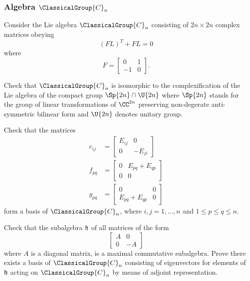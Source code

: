 \subsubsection{Algebra \texorpdfstring{$\ClassicalGroup{C}_{n}$}{Cn}}
Consider the Lie algebra $\ClassicalGroup{C}_{n}$ consisting of $2n\times2n$
complex matrices obeying
\begin{equation}
(FL)^{T}+FL=0
\end{equation}
where
\begin{equation}
F=\begin{bmatrix}0&1\\
-1&0
\end{bmatrix}.
\end{equation}

\begin{exercise}
Check that $\ClassicalGroup{C}_{n}$ is isomorphic to the complexification of the
Lie algebra of the compact group $\Sp{2n}\cap \U{2n}$ where
$\Sp{2n}$ stands for the group of linear transformations of
$\CC^{2n}$ preserving non-degerate anti-symmetric bilinear
form and $\U{2n}$ denotes unitary group.
\end{exercise}
\begin{exercise}
Check that the matrices
\begin{subequations}
\begin{align}
e_{ij} &= \begin{bmatrix}E_{ij}&0\\0&-E_{ji}
\end{bmatrix}\\
f_{pq}&= \begin{bmatrix}0&E_{pq}+E_{qp}\\0&0
\end{bmatrix}\\
g_{pq}&=\begin{bmatrix}0&0\\E_{pq}+E_{qp}&0
\end{bmatrix}
\end{align}
\end{subequations}
form a basis of $\ClassicalGroup{C}_{n}$, where $i,j=1,...,n$ and $1\leq p\leq
q\leq n$.
\end{exercise}
\begin{exercise}
Check that the subalgebra $\frak{h}$ of all matrices of the form
\begin{equation}
\begin{bmatrix}
A&0\\
0&-A
\end{bmatrix}
\end{equation}
where $A$ is a diagonal matrix, is a maximal commutative
subalgebra. Prove there exists a basis of $\ClassicalGroup{C}_{n}$ consisting of
eigenvectors for elements of $\frak{h}$ acting on $\ClassicalGroup{C}_{n}$ by
means of adjoint representation.
\end{exercise}
